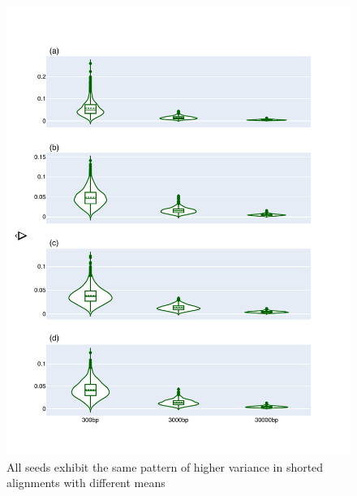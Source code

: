 \begin{figure}[!ht]
\centering
\includegraphics[width=\textwidth]{figures/plots/synthetic/convergence/all_seeds.pdf}
\caption{All seeds exhibit the same pattern of higher variance in shorted alignments with different means}
\label{fig:synthetic/conv/all_seeds}
\end{figure}